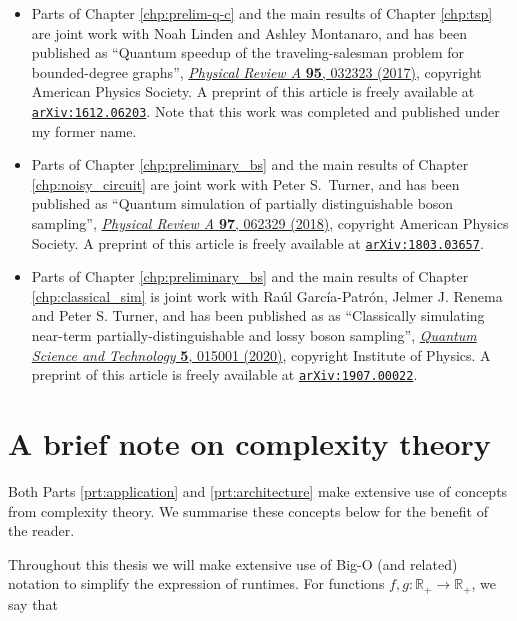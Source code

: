 \begin{itemize}
\item Parts of Chapter \ref{chp:prelim-q-c} and the main results of Chapter \ref{chp:tsp} are joint work with Noah Linden and Ashley Montanaro, and has been published as ``Quantum speedup of the traveling-salesman problem for bounded-degree graphs'', \href{https://link.aps.org/doi/10.1103/PhysRevA.95.032323}{\textit{Physical Review A} \textbf{95}, 032323 (2017)}, copyright American Physics Society. A preprint of this article is freely available at {\tt \href{https://arxiv.org/abs/1612.06203}{arXiv:1612.06203}}. Note that this work was completed and published under my former name.

\item Parts of Chapter \ref{chp:preliminary_bs} and the main results of Chapter \ref{chp:noisy_circuit} are joint work with Peter S.\ Turner, and has been published as ``Quantum simulation of partially distinguishable boson sampling'', \href{https://link.aps.org/doi/10.1103/PhysRevA.97.062329}{\textit{Physical Review A} \textbf{97}, 062329 (2018)}, copyright American Physics Society. A preprint of this article is freely available at {\tt \href{https://arxiv.org/abs/1803.03657}{arXiv:1803.03657}}.

\item Parts of Chapter \ref{chp:preliminary_bs} and the main results of Chapter \ref{chp:classical_sim} is joint work with Ra\'{u}l Garc\'{i}a-Patr\'{o}n, Jelmer J. Renema and Peter S. Turner, and has been published as as ``Classically simulating near-term partially-distinguishable and lossy boson sampling'', \href{https://iopscience.iop.org/article/10.1088/2058-9565/ab5555}{\textit{Quantum Science and Technology} \textbf{5}, 015001 (2020)}, copyright Institute of Physics. A preprint of this article is freely available at {\tt \href{https://arxiv.org/abs/1907.00022}{arXiv:1907.00022}}.
\end{itemize}

\section{A brief note on complexity theory}
\label{sec:notation}

Both Parts \ref{prt:application} and \ref{prt:architecture} make extensive use of concepts from complexity theory. We summarise these concepts below for the benefit of the reader.

Throughout this thesis we will make extensive use of Big-O (and related) notation to simplify the expression of runtimes. For functions $f, g\colon \mathbb{R}_+\rightarrow \mathbb{R}_+$, we say that

